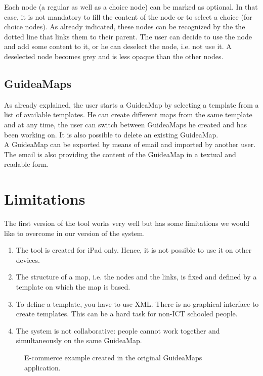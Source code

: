 Each node (a regular as well as a choice node) can be marked as optional. In that case, it is not mandatory to fill the content of the node or to select a choice (for choice nodes). As already indicated, these nodes can be recognized by the the dotted line that links them to their parent. The user can decide to use the node and add some content to it, or he can deselect the node, i.e. not use it. A deselected node becomes grey and is less opaque than the other nodes.

\subsection{GuideaMaps}
As already explained, the user starts a GuideaMap by selecting a template from a list of available templates. He can create different maps from the same template and at any time, the user can switch between GuideaMaps he created and has been working on. It is also possible to delete an existing GuideaMap.\\

A GuideaMap can be exported by means of email and imported by another user. The email is also providing the content of the GuideaMap in a textual and readable form.

\section{Limitations}\label{sec:guidamaps-limitations}
The first version of the tool works very well but has some limitations we would like to overcome in our version of the system.
\begin{enumerate}
	\item The tool is created for iPad only. Hence, it is not possible to use it on other devices.
	\item The structure of a map, i.e. the nodes and the links, is fixed and defined by a template on which the map is based.
	\item To define a template, you have to use XML. There is no graphical interface to create templates. This can be a hard task for non-ICT schooled people.
	\item The system is not collaborative: people cannot work together and simultaneously on the same GuideaMap.
\end{enumerate}

\begin{figure}[H]
	\centering
	\caption{E-commerce example created in the original GuideaMaps application.}
	\label{fig:gm1.0-ecommerce}
\end{figure}


